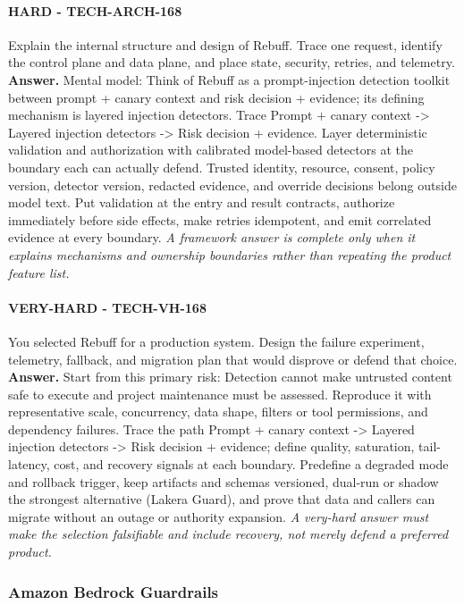 \paragraph{HARD - TECH-ARCH-168} Explain the internal structure and design of Rebuff. Trace one request, identify the control plane and data plane, and place state, security, retries, and telemetry.
\textbf{Answer.} Mental model: Think of Rebuff as a prompt-injection detection toolkit between prompt + canary context and risk decision + evidence; its defining mechanism is layered injection detectors. Trace Prompt + canary context -> Layered injection detectors -> Risk decision + evidence. Layer deterministic validation and authorization with calibrated model-based detectors at the boundary each can actually defend. Trusted identity, resource, consent, policy version, detector version, redacted evidence, and override decisions belong outside model text. Put validation at the entry and result contracts, authorize immediately before side effects, make retries idempotent, and emit correlated evidence at every boundary.
\textit{A framework answer is complete only when it explains mechanisms and ownership boundaries rather than repeating the product feature list.}
\paragraph{VERY-HARD - TECH-VH-168} You selected Rebuff for a production system. Design the failure experiment, telemetry, fallback, and migration plan that would disprove or defend that choice.
\textbf{Answer.} Start from this primary risk: Detection cannot make untrusted content safe to execute and project maintenance must be assessed. Reproduce it with representative scale, concurrency, data shape, filters or tool permissions, and dependency failures. Trace the path Prompt + canary context -> Layered injection detectors -> Risk decision + evidence; define quality, saturation, tail-latency, cost, and recovery signals at each boundary. Predefine a degraded mode and rollback trigger, keep artifacts and schemas versioned, dual-run or shadow the strongest alternative (Lakera Guard), and prove that data and callers can migrate without an outage or authority expansion.
\textit{A very-hard answer must make the selection falsifiable and include recovery, not merely defend a preferred product.}
\subsubsection*{Amazon Bedrock Guardrails}
